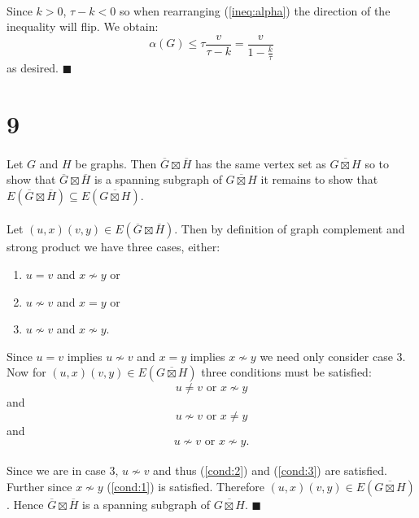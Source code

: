 \documentclass[letterpaper,12pt,oneside,onecolumn]{article}
\newcommand{\1}{\mathbbm{1}}
\begin{document}
\paragraph{}
Since $k > 0$, $\tau - k < 0$ so when rearranging (\ref{ineq:alpha}) the direction of the inequality will flip. We obtain:
$$\alpha(G) \leq \tau\frac{v}{\tau-k} = \frac{v}{1-\frac{k}{\tau}}$$
as desired. $\blacksquare$
\section*{9}
\paragraph{}
Let $G$ and $H$ be graphs. Then $\overline{G} \boxtimes \overline{H}$ has the same vertex set as $\overline{G\boxtimes H}$ so to show that $\overline{G} \boxtimes \overline{H}$ is a spanning subgraph of $\overline{G\boxtimes H}$ it remains to show that $E(\overline{G} \boxtimes \overline{H})\subseteq E(\overline{G\boxtimes H})$.
\paragraph{}
Let $(u,x) (v,y) \in E(\overline{G} \boxtimes \overline{H})$. Then by definition of graph complement and strong product we have three cases, either:
\begin{enumerate}
\item $u = v$ and $x \not\sim y$ or
\item $u \not\sim v$ and $x = y$ or
\item $u \not\sim v$ and $x \not\sim y$.
\end{enumerate}
Since $u = v$ implies $u \not \sim v$ and $x = y$ implies $x \not \sim y$ we need only consider case $3$. Now for $(u,x)(v,y) \in E(\overline{G\boxtimes H})$ three conditions must be satisfied:
\begin{equation} u \neq v \text{ or } x\not\sim y \label{cond:1}\end{equation}
and
\begin{equation} u \not\sim v \text{ or } x \neq y \label{cond:2}\end{equation}
and
\begin{equation} u \not\sim v \text{ or } x\not\sim y.\label{cond:3}\end{equation}
\paragraph{}
Since we are in case $3$, $u\not\sim v$ and thus (\ref{cond:2}) and (\ref{cond:3}) are satisfied. Further since $x \not\sim y$ (\ref{cond:1}) is satisfied. Therefore $(u,x)(v,y) \in E(\overline{G\boxtimes H})$. Hence $\overline{G} \boxtimes \overline{H}$ is a spanning subgraph of $\overline{G\boxtimes H}$. $\blacksquare$
\end{document}
